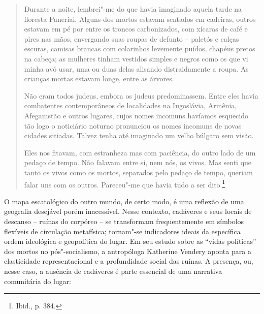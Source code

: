 \begin{quote}
Durante a noite, lembrei"-me do que havia imaginado aquela tarde na
floresta Paneriai. Alguns dos mortos estavam sentados em cadeiras,
outros estavam em pé por entre os troncos carbonizados, com xícaras de
café e pires nas mãos, envergando suas roupas de defunto -- paletós e
calças escuras, camisas brancas com colarinhos levemente puídos, chapéus
pretos na cabeça; as mulheres tinham vestidos simples e negros como os
que vi minha avó usar, uma ou duas delas alisando distraidamente a
roupa. As crianças mortas estavam longe, entre as árvores.

Não eram todos judeus, embora os judeus predominassem. Entre eles havia
combatentes contemporâneos de localidades na Iugoslávia, Armênia,
Afeganistão e outros lugares, cujos nomes incomuns havíamos esquecido
tão logo o noticiário noturno pronunciou os nomes incomuns de novas
cidades sitiadas. Talvez tenha até imaginado um velho búlgaro sem visão.

Eles nos fitavam, com estranheza mas com paciência, do outro lado de um
pedaço de tempo. Não falavam entre si, nem nós, os vivos. Mas senti que
tanto os vivos como os mortos, separados pelo pedaço de tempo, queriam
falar uns com os outros. Pareceu"-me que havia tudo a ser dito.\footnote{Ibid., p. 384.} 
\end{quote}

O mapa escatológico do outro mundo, de certo modo, é uma reflexão de uma
geografia desejável porém inacessível. Nesse contexto, cadáveres e seus
locais de descanso -- ruínas do corpóreo -- se transformam frequentemente
em símbolos flexíveis de circulação metafísica; tornam"-se indicadores
ideais da específica ordem ideológica e geopolítica do lugar. Em seu
estudo sobre as ``vidas políticas'' dos mortos no pós"-socialismo, a
antropóloga Katherine Vendery aponta para a elasticidade
representacional e a profundidade social das ruínas. A presença, ou,
nesse caso, a ausência de cadáveres é parte essencial de uma narrativa
comunitária do lugar:

